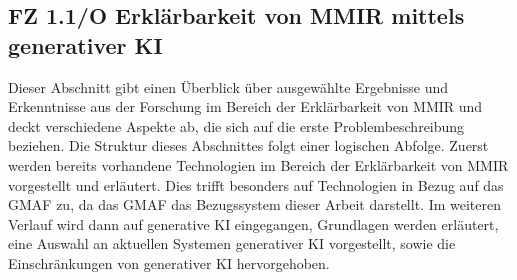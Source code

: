\subsection[FZ 1.1/O Erklärbarkeit von MMIR mittels generativer KI]{\texorpdfstring{FZ 1.1/O Erklärbarkeit von MMIR mittels \\ generativer KI}{FZ 1.1/O Erklärbarkeit von MMIR mittels generativer KI}}
\label{sec2:sota:subsec:fz-explainability}
Dieser Abschnitt gibt einen Überblick über ausgewählte Ergebnisse und Erkenntnisse aus der Forschung im Bereich der Erklärbarkeit von MMIR und deckt verschiedene Aspekte ab, die sich auf die erste Problembeschreibung beziehen.
Die Struktur dieses Abschnittes folgt einer logischen Abfolge.
Zuerst werden bereits vorhandene Technologien im Bereich der Erklärbarkeit von MMIR vorgestellt und erläutert.
Dies trifft besonders auf Technologien in Bezug auf das GMAF zu, da das GMAF das Bezugssystem dieser Arbeit darstellt.
Im weiteren Verlauf wird dann auf generative KI eingegangen, Grundlagen werden erläutert, eine Auswahl an aktuellen Systemen generativer KI vorgestellt, sowie die Einschränkungen von generativer KI hervorgehoben.

